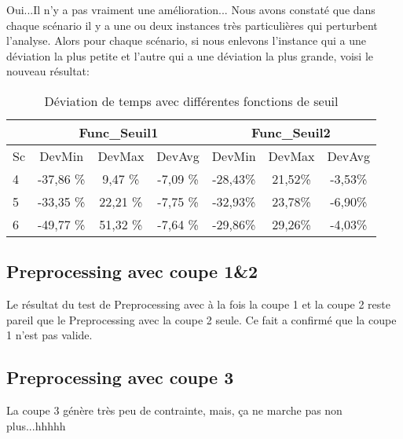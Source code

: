\documentclass[twoside,fleqn]{EPURapport}
\begin{document}
Oui...Il n'y a pas vraiment une amélioration... Nous avons constaté que dans chaque scénario il y a une ou deux instances très particulières qui perturbent l'analyse. Alors pour chaque scénario, si nous enlevons l'instance qui a une déviation la plus petite et l'autre qui a une déviation la plus grande, voisi le nouveau résultat:
\begin{table}[h]
    \centering
    \begin{tabular}{|l|c|c|c|c|c|c|}
    	\hline
  &\multicolumn{3}{c}{Func\_Seuil1}	&\multicolumn{3}{|c|}{Func\_Seuil2}\\ \hline
Sc  & 	DevMin	& DevMax	& DevAvg& 	DevMin	& DevMax	& DevAvg \\ \hline
4 & -37,86 \% &9,47  \% & -7,09 \% &-28,43\% & 21,52\% & -3,53\% \\ \hline
5 & -33,35 \% &22,21 \% & -7,75 \% &-32,93\% & 23,78\% & -6,90\% \\ \hline
6 &-49,77  \% &51,32 \% & -7,64 \% &-29,86\% & 29,26\% & -4,03\% \\ \hline
    \end{tabular}
    \label{tab_cut2_seuil_tim_cmp_modife}
    \caption{Déviation de temps avec différentes fonctions de seuil}
\end{table}
\bigskip

\subsection{Preprocessing avec coupe 1\&2}
Le résultat du test de Preprocessing avec à la fois la coupe 1 et la coupe 2 reste pareil que le Preprocessing avec la coupe 2 seule. Ce fait a confirmé que la coupe 1 n'est pas valide.

\subsection{Preprocessing avec coupe 3}
La coupe 3 génère très peu de contrainte, mais, ça ne marche pas non plus...hhhhh
\end{document}
